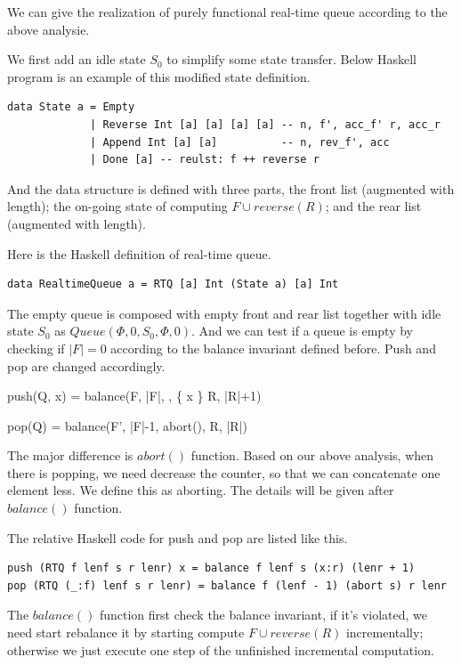\documentclass{article}
\begin{document}
We can give the realization of purely functional real-time queue according to the above
analysie.

We first add an idle state $S_0$ to simplify some state transfer. Below Haskell program
is an example of this modified state definition.

\lstset{language=Haskell}
\begin{lstlisting}
data State a = Empty
             | Reverse Int [a] [a] [a] [a] -- n, f', acc_f' r, acc_r
             | Append Int [a] [a]          -- n, rev_f', acc
             | Done [a] -- reulst: f ++ reverse r
\end{lstlisting}

And the data structure is defined with three parts, the front list (augmented with length);
the on-going state of computing $F \cup reverse(R)$; and the rear list (augmented with length).

Here is the Haskell definition of real-time queue.

\lstset{language=Haskell}
\begin{lstlisting}
data RealtimeQueue a = RTQ [a] Int (State a) [a] Int
\end{lstlisting}

The empty queue is composed with empty front and rear list together with idle state $S_0$ as
$Queue(\Phi, 0, S_0, \Phi, 0)$. And we can test if a queue is empty by checking if $|F| = 0$ 
according
to the balance invariant defined before. Push and pop are changed accordingly.

\be
  push(Q, x) = balance(F, |F|, , \{ x \} \cup R, |R|+1)
\ee

\be
  pop(Q) = balance(F', |F|-1, abort(), R, |R|)
\ee

The major difference is $abort()$ function. Based on our above analysis, when there
is popping, we need decrease the counter, so that we can concatenate one element less.
We define this as aborting. The details will be given after $balance()$ function.

The relative Haskell code for push and pop are listed like this.

\lstset{language=Haskell}
\begin{lstlisting}
push (RTQ f lenf s r lenr) x = balance f lenf s (x:r) (lenr + 1)
pop (RTQ (_:f) lenf s r lenr) = balance f (lenf - 1) (abort s) r lenr
\end{lstlisting}

The $balance()$ function first check the balance invariant, if it's violated, we need
start rebalance it by starting compute $F \cup reverse(R)$ incrementally; otherwise
we just execute one step of the unfinished incremental computation. 
\end{document}
